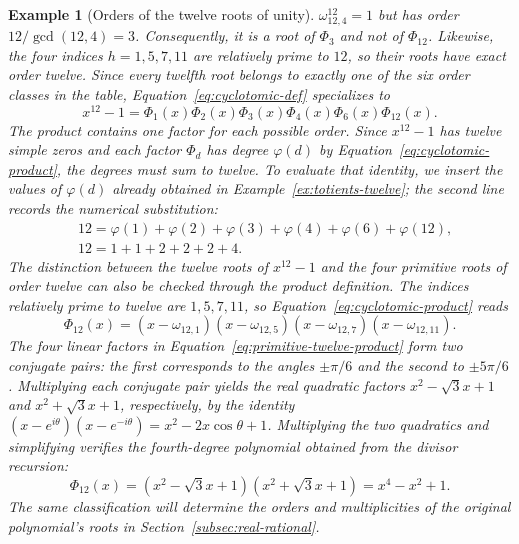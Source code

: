 \documentclass[11pt,a4paper]{article}
\numberwithin{equation}{section}
\theoremstyle{uprightpaper}
\newtheorem{example}{Example}[section]
\begin{document}
\begin{example}[Orders of the twelve roots of unity]
$\omega_{12,4}^{12}=1$ but has order $12/\gcd(12,4)=3$.
Consequently, it is a root of $\Phi_3$ and not of $\Phi_{12}$.
Likewise, the four indices $h=1,5,7,11$ are relatively prime to
$12$, so their roots have exact order twelve. Since every twelfth root
belongs to exactly one of the six order classes in the table,
Equation~\eqref{eq:cyclotomic-def} specializes to
\begin{equation}\label{eq:twelfth-split}
 x^{12}-1=\Phi_1(x)\Phi_2(x)\Phi_3(x)\Phi_4(x)\Phi_6(x)\Phi_{12}(x).
\end{equation}
The product contains one factor for each possible order. Since
$x^{12}-1$ has twelve simple zeros and each factor $\Phi_d$ has
degree $\varphi(d)$ by Equation~\eqref{eq:cyclotomic-product}, the degrees
must sum to twelve. To evaluate that identity, we insert the values of
$\varphi(d)$ already obtained in Example~\ref{ex:totients-twelve}; the
second line records the numerical substitution:
\begin{align}
 &12=\varphi(1)+\varphi(2)+\varphi(3)+\varphi(4)
      +\varphi(6)+\varphi(12),\label{eq:twelfth-degree}\\
 &12=1+1+2+2+2+4.\label{eq:twelfth-degree-values}
\end{align}
The distinction between the twelve roots of $x^{12}-1$ and the four
primitive roots of order twelve can also be checked through the product
definition. The indices relatively prime to twelve are $1,5,7,11$,
so Equation~\eqref{eq:cyclotomic-product} reads
\begin{equation}\label{eq:primitive-twelve-product}
 \Phi_{12}(x)=(x-\omega_{12,1})(x-\omega_{12,5})
   (x-\omega_{12,7})(x-\omega_{12,11}).
\end{equation}
The four linear factors in Equation~\eqref{eq:primitive-twelve-product}
form two conjugate pairs: the first corresponds to the angles
$\pm\pi/6$ and the second to $\pm5\pi/6$. Multiplying each
conjugate pair yields the real quadratic factors
$x^2-\sqrt3x+1$ and $x^2+\sqrt3x+1$, respectively, by the
identity $(x-e^{i\theta})(x-e^{-i\theta})=x^2-2x\cos\theta+1$.
Multiplying the two quadratics and simplifying verifies the fourth-degree
polynomial obtained from the divisor recursion:
\begin{equation}\label{eq:primitive-twelve-evaluation}
 \Phi_{12}(x)=(x^2-\sqrt3x+1)(x^2+\sqrt3x+1)=x^4-x^2+1.
\end{equation}
The same classification will determine the orders and multiplicities
of the original polynomial's roots in Section~\ref{subsec:real-rational}.
\end{example}
\end{document}
